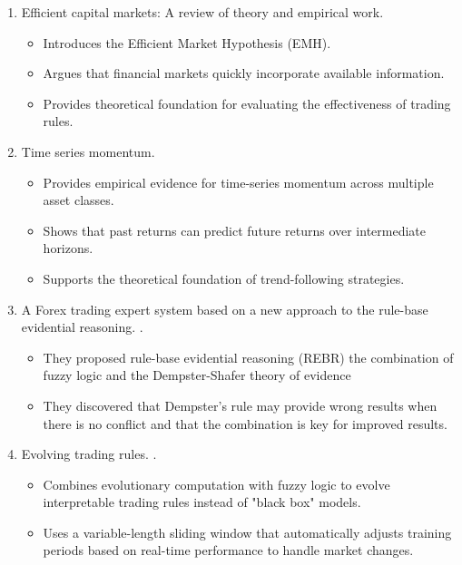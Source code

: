 \begin{enumerate}

    \item Efficient capital markets: A review of theory and empirical work.
    \cite{fama1970efficient}

    \begin{itemize}
        \item Introduces the Efficient Market Hypothesis (EMH).
        \item Argues that financial markets quickly incorporate available information.
        \item Provides theoretical foundation for evaluating the effectiveness of trading rules.
    \end{itemize}

    \item Time series momentum.
    \cite{moskowitz2012time}

     \begin{itemize}
        \item Provides empirical evidence for time-series momentum across multiple asset classes.
        \item Shows that past returns can predict future returns over intermediate horizons.
        \item Supports the theoretical foundation of trend-following strategies.
    \end{itemize}
    
    \item A Forex trading expert system based on a new approach to the rule-base evidential reasoning. 
    \cite{dymova2016forex}.
    
    \begin{itemize}
    \item They proposed rule-base evidential reasoning (REBR) the combination of fuzzy logic and the Dempster-Shafer theory of evidence
    \item They discovered that Dempster's rule may provide wrong results when there is no conflict and that the combination is key for improved results.
    \end{itemize}
    
    \item Evolving trading rules. 
    \cite{ghandar2008evolving}.
    
    \begin{itemize}
    \item Combines evolutionary computation with fuzzy logic to evolve interpretable trading rules instead of "black box" models.
    \item Uses a variable-length sliding window that automatically adjusts training periods based on real-time performance to handle market changes.
    \end{itemize}


\end{enumerate}
